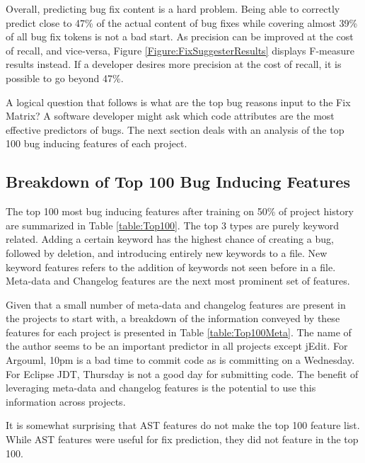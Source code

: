 \documentclass[preprint,10pt]{sigplanconf}
\begin{document}
Overall, predicting bug fix content is a hard problem. Being able to correctly predict close to 47\% of the actual content of bug fixes while covering almost 39\% of all bug fix tokens is not a bad start. As precision can be improved at the cost of recall, and vice-versa, Figure \ref{Figure:FixSuggesterResults} displays F-measure results instead. If a developer desires more precision at the cost of recall, it is possible to go beyond 47\%. 

\par A logical question that follows is what are the top bug reasons input to the Fix Matrix? A software developer might ask which code attributes are the most effective predictors of bugs. The next section deals with an analysis of the top 100 bug inducing features of each project.

\subsection{Breakdown of Top 100 Bug Inducing Features}
\label{Top100BugReasons}
The top 100 most bug inducing features after training on 50\% of project history are summarized in Table \ref{table:Top100}. The top 3 types are purely keyword related. Adding a certain keyword has the highest chance of creating a bug, followed by deletion, and introducing entirely new keywords to a file. New keyword features refers to the addition of keywords not seen before in a file. Meta-data and Changelog features are the next most prominent set of features. 

Given that a small number of meta-data and changelog features are present in the projects to start with, a breakdown of the information conveyed by these features for each project is presented in Table \ref{table:Top100Meta}. The name of the author seems to be an important predictor in all projects except jEdit. For Argouml, 10pm is a bad time to commit code as is committing on a Wednesday. For Eclipse JDT, Thursday is not a good day for submitting code. The benefit of leveraging meta-data and changelog features is the potential to use this information across projects.

\par It is somewhat surprising that AST features do not make the top 100 feature list. While AST features were useful for fix prediction, they did not feature in the top 100.
\end{document}
